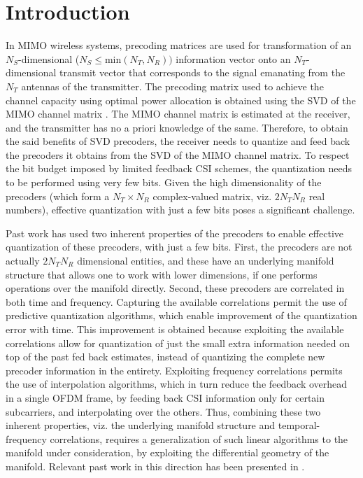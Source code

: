 \documentclass[conference]{IEEEtran}
\begin{document}
\section{Introduction}
\label{intro}
In MIMO wireless systems, precoding matrices are used for transformation of an $N_S$-dimensional ($N_S \leq \text{min}(N_T,N_R))$ information vector onto an $N_T$-dimensional transmit vector that corresponds to the signal emanating from the $N_T$ antennas of the transmitter.
The precoding matrix used to achieve the channel capacity using optimal power allocation is obtained using the SVD of the MIMO channel matrix \cite{love2008overview}.
The MIMO channel matrix is estimated at the receiver, and the transmitter has no a priori knowledge of the same.
Therefore, to obtain the said benefits of SVD precoders, the receiver needs to quantize and feed back the precoders it obtains from the SVD of the MIMO channel matrix.
To respect the bit budget imposed by limited feedback CSI schemes, the quantization needs to be performed using very few bits.
Given the high dimensionality of the precoders (which form a $N_T \times N_R$ complex-valued matrix, viz. $2N_TN_R$ real numbers), effective quantization with just a few bits poses a significant challenge.

Past work has used two inherent properties of the precoders to enable effective quantization of these precoders, with just a few bits.
First, the precoders are not actually $2N_TN_R$ dimensional entities, and these have an underlying manifold structure that allows one to work with lower dimensions, if one performs operations over the manifold directly.
Second, these precoders are correlated in both time and frequency.
Capturing the available correlations permit the use of predictive quantization algorithms, which enable improvement of the quantization error with time.
This improvement is obtained because exploiting the available correlations allow for quantization of just the small extra information needed on top of the past fed back estimates, instead of quantizing the complete new precoder information in the entirety.
Exploiting frequency correlations permits the use of interpolation algorithms, which in turn reduce the feedback overhead in a single OFDM frame, by feeding back CSI information only for certain subcarriers, and interpolating over the others.
Thus, combining these two inherent properties, viz. the underlying manifold structure and temporal-frequency correlations, requires a generalization of such linear algorithms to the manifold under consideration, by exploiting the differential geometry of the manifold. Relevant past work in this direction has been presented in \cite{Gupt1905:Predictive,6891198,6545375,5671092,Li2016,khaled2005quantized,krishnamachari2013geometry}.
\end{document}
